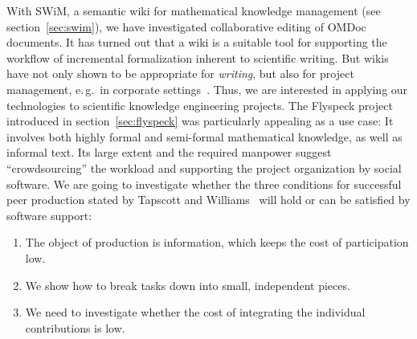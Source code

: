 With SWiM, a semantic wiki for mathematical knowledge management (see
section~\ref{sec:swim}), we have investigated collaborative editing of OMDoc documents.
It has turned out that a wiki is a suitable tool for supporting the workflow of
incremental formalization inherent to scientific writing.  But wikis have not only shown
to be appropriate for \emph{writing}, but also for project management, e.\,g.\ in
corporate settings~\cite{leuf01:wikiway}.  Thus, we are interested in applying our
technologies to scientific knowledge engineering projects.  The Flyspeck project
introduced in section~\ref{sec:flyspeck} was particularly appealing as a use case: It
involves both highly formal and semi-formal mathematical knowledge, as well as informal
text.  Its large extent and the required manpower suggest ``crowdsourcing'' the workload
and supporting the project organization by social software.  We are going to investigate
whether the three conditions for successful peer production stated by Tapscott and
Williams~\cite{wikinomics} will hold or can be satisfied by software support:

\begin{enumerate}
\item The object of production is information, which keeps the cost of participation low.
\item We show how to break tasks down into small, independent pieces.
\item We need to investigate whether the cost of integrating the individual contributions
  is low.
\end{enumerate}

